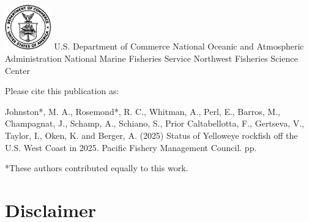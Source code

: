 \documentclass[
]{scrartcl}
\renewcommand*\contentsname{Table of contents}
\newcommand\contentsname{Table of contents}
\begin{document}
\begin{titlepage}
\begin{minipage}[b][\textheight][s]{\textwidth}
  \vspace{1\baselineskip}

  \includegraphics[alt={},width=2cm]{support_files/us_doc_logo.png}\newline %
  U.S. Department of Commerce\newline
  National Oceanic and Atmospheric Administration\newline
  National Marine Fisheries Service\newline
  Northwest Fisheries Science Center\newline

  \end{minipage}
  \restoregeometry
  \end{titlepage}

\renewcommand*\contentsname{Table of contents}
{
\hypersetup{linkcolor=}
\setcounter{tocdepth}{3}
\tableofcontents
}

\setcounter{page}{1}

\renewcommand{\thetable}{\roman{table}}
\renewcommand{\thefigure}{\roman{figure}}

\newpage{}

Please cite this publication as:

Johnston*, M. A., Rosemond*, R. C., Whitman, A., Perl, E., Barros, M.,
Champagnat, J., Schamp, A., Schiano, S., Prior Caltabellotta, F.,
Gertseva, V., Taylor, I., Oken, K. and Berger, A. (2025) Status of
Yelloweye rockfish off the U.S. West Coast in 2025. Pacific Fishery
Management Council. \pageref*{LastPage}{} pp.

*These authors contributed equally to this work.

\newpage{}

\setcounter{page}{1}

\renewcommand{\thetable}{\roman{table}}
\renewcommand{\thefigure}{\roman{figure}}

\section*{Disclaimer}\label{disclaimer}
\end{document}
